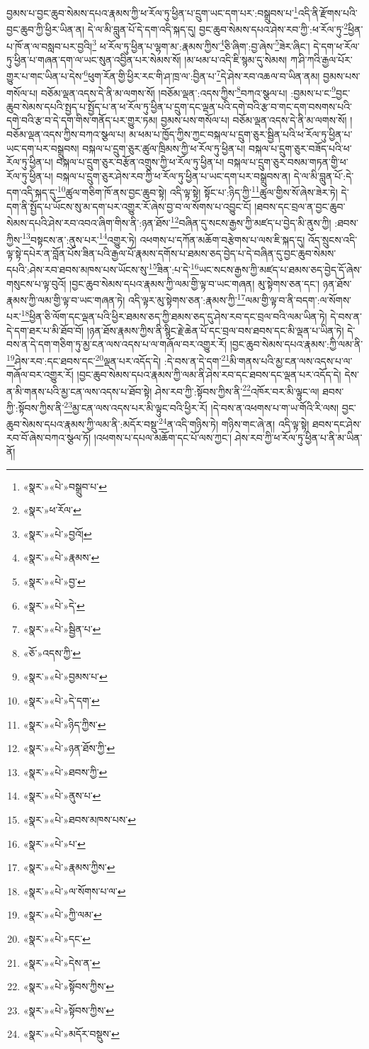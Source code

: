 བྱམས་པ་བྱང་ཆུབ་སེམས་དཔའ་རྣམས་ཀྱི་ཕ་རོལ་ཏུ་ཕྱིན་པ་དྲུག་ཡང་དག་པར་:བསྒྲུབས་པ་\footnote{«སྣར་»«པེ་»བསྒྲུབ་པ་}འདི་ནི་རྫོགས་པའི་བྱང་ཆུབ་ཀྱི་ཕྱིར་ཡིན་ན། དེ་ལ་མི་བླུན་པོ་དེ་དག་འདི་སྐད་དུ། བྱང་ཆུབ་སེམས་དཔའ་ཤེས་རབ་ཀྱི་:ཕ་རོལ་ཏུ་\footnote{«སྣར་»ཕ་རོལ་}ཕྱིན་པ་ཁོ་ན་ལ་བསླབ་པར་བྱའི།\footnote{«སྣར་»«པེ་»བྱའོ།} ཕ་རོལ་ཏུ་ཕྱིན་པ་ལྷག་མ་:རྣམས་ཀྱིས་\footnote{«སྣར་»«པེ་»རྣམས་}ཅི་ཞིག་:བྱ་ཞེས་\footnote{«སྣར་»«པེ་»བྱ་}ཟེར་ཞིང་། དེ་དག་ཕ་རོལ་ཏུ་ཕྱིན་པ་གཞན་དག་ལ་ཡང་སུན་འབྱིན་པར་སེམས་སོ། །མ་ཕམ་པ་འདི་ཇི་སྙམ་དུ་སེམས། ཀ་ཤི་ཀའི་རྒྱལ་པོར་གྱུར་པ་གང་ཡིན་པ་དེས་\footnote{«སྣར་»«པེ་»དེ་}ཕུག་རོན་གྱི་ཕྱིར་རང་གི་ཤ་ཁྲ་ལ་:བྱིན་པ་\footnote{«སྣར་»«པེ་»སྦྱིན་པ་}དེ་ཤེས་རབ་འཆལ་བ་ཡིན་ནམ། བྱམས་པས་གསོལ་པ། བཅོམ་ལྡན་འདས་དེ་ནི་མ་ལགས་སོ། །བཅོམ་ལྡན་:འདས་ཀྱིས་\footnote{«ཅོ་»འདས་ཀྱི་}བཀའ་སྩལ་པ། :བྱམས་པ་ང་\footnote{«སྣར་»«པེ་»བྱམས་པ་}བྱང་ཆུབ་སེམས་དཔའི་སྤྱད་པ་སྤྱོད་པ་ན་ཕ་རོལ་ཏུ་ཕྱིན་པ་དྲུག་དང་ལྡན་པའི་དགེ་བའི་རྩ་བ་གང་དག་བསགས་པའི་དགེ་བའི་རྩ་བ་དེ་དག་གིས་གནོད་པར་གྱུར་ཏམ། བྱམས་པས་གསོལ་པ། བཅོམ་ལྡན་འདས་དེ་ནི་མ་ལགས་སོ། །བཅོམ་ལྡན་འདས་ཀྱིས་བཀའ་སྩལ་པ། མ་ཕམ་པ་ཁྱོད་ཀྱིས་ཀྱང་བསྐལ་པ་དྲུག་ཅུར་སྦྱིན་པའི་ཕ་རོལ་ཏུ་ཕྱིན་པ་ཡང་དག་པར་བསྒྲུབས། བསྐལ་པ་དྲུག་ཅུར་ཚུལ་ཁྲིམས་ཀྱི་ཕ་རོལ་ཏུ་ཕྱིན་པ། བསྐལ་པ་དྲུག་ཅུར་བཟོད་པའི་ཕ་རོལ་ཏུ་ཕྱིན་པ། བསྐལ་པ་དྲུག་ཅུར་བརྩོན་འགྲུས་ཀྱི་ཕ་རོལ་ཏུ་ཕྱིན་པ། བསྐལ་པ་དྲུག་ཅུར་བསམ་གཏན་གྱི་ཕ་རོལ་ཏུ་ཕྱིན་པ། བསྐལ་པ་དྲུག་ཅུར་ཤེས་རབ་ཀྱི་ཕ་རོལ་ཏུ་ཕྱིན་པ་ཡང་དག་པར་བསྒྲུབས་ན། དེ་ལ་མི་བླུན་པོ་:དེ་དག་འདི་སྐད་དུ་\footnote{«སྣར་»«པེ་»དེ་དག་}ཚུལ་གཅིག་ཁོ་ནས་བྱང་ཆུབ་སྟེ། འདི་ལྟ་སྟེ། སྟོང་པ་:ཉིད་ཀྱི་\footnote{«སྣར་»«པེ་»ཉིད་ཀྱིས་}ཚུལ་གྱིས་སོ་ཞེས་ཟེར་ཏེ། དེ་དག་ནི་སྤྱོད་པ་ཡོངས་སུ་མ་དག་པར་འགྱུར་རོ་ཞེས་བྱ་བ་ལ་སོགས་པ་འབྱུང་ངོ། །ཐབས་དང་བྲལ་ན་བྱང་ཆུབ་སེམས་དཔའི་ཤེས་རབ་འབའ་ཞིག་གིས་ནི་:ཉན་ཐོས་\footnote{«སྣར་»«པེ་»ཉན་ཐོས་ཀྱི་}བཞིན་དུ་སངས་རྒྱས་ཀྱི་མཛད་པ་བྱེད་མི་ནུས་ཀྱི། :ཐབས་ཀྱིས་\footnote{«སྣར་»«པེ་»ཐབས་ཀྱི་}བསྟངས་ན་:ནུས་པར་\footnote{«སྣར་»«པེ་»ནུས་པ་}འགྱུར་ཏེ། འཕགས་པ་དཀོན་མཆོག་བརྩེགས་པ་ལས་ཇི་སྐད་དུ། འོད་སྲུངས་འདི་ལྟ་སྟེ་དཔེར་ན་བློན་པོས་ཟིན་པའི་རྒྱལ་པོ་རྣམས་དགོས་པ་ཐམས་ཅད་བྱེད་པ་དེ་བཞིན་དུ་བྱང་ཆུབ་སེམས་དཔའི་:ཤེས་རབ་ཐབས་མཁས་པས་ཡོངས་སུ་\footnote{«སྣར་»«པེ་»ཐབས་མཁས་པས་}ཟིན་:པ་དེ་\footnote{«སྣར་»«པེ་»པ་}ཡང་སངས་རྒྱས་ཀྱི་མཛད་པ་ཐམས་ཅད་བྱེད་དོ་ཞེས་གསུངས་པ་ལྟ་བུའོ། །བྱང་ཆུབ་སེམས་དཔའ་རྣམས་ཀྱི་ལམ་གྱི་ལྟ་བ་ཡང་གཞན། མུ་སྟེགས་ཅན་དང་། ཉན་ཐོས་རྣམས་ཀྱི་ལམ་གྱི་ལྟ་བ་ཡང་གཞན་ཏེ། འདི་ལྟར་མུ་སྟེགས་ཅན་:རྣམས་ཀྱི་\footnote{«སྣར་»«པེ་»རྣམས་ཀྱིས་}ལམ་གྱི་ལྟ་བ་ནི་བདག་:ལ་སོགས་པར་\footnote{«སྣར་»«པེ་»ལ་སོགས་པ་ལ་}ཕྱིན་ཅི་ལོག་དང་ལྡན་པའི་ཕྱིར་ཐམས་ཅད་ཀྱི་ཐམས་ཅད་དུ་ཤེས་རབ་དང་བྲལ་བའི་ལམ་ཡིན་ཏེ། དེ་བས་ན་དེ་དག་ཐར་པ་མི་ཐོབ་བོ། །ཉན་ཐོས་རྣམས་ཀྱིས་ནི་སྙིང་རྗེ་ཆེན་པོ་དང་བྲལ་བས་ཐབས་དང་མི་ལྡན་པ་ཡིན་ཏེ། དེ་བས་ན་དེ་དག་གཅིག་ཏུ་མྱ་ངན་ལས་འདས་པ་ལ་གཞོལ་བར་འགྱུར་རོ། །བྱང་ཆུབ་སེམས་དཔའ་རྣམས་:ཀྱི་ལམ་ནི་\footnote{«སྣར་»«པེ་»ཀྱི་ལམ་}ཤེས་རབ་:དང་ཐབས་དང་\footnote{«སྣར་»«པེ་»དང་}ལྡན་པར་འདོད་དེ། :དེ་བས་ན་དེ་དག་\footnote{«སྣར་»«པེ་»དེས་ན་}མི་གནས་པའི་མྱ་ངན་ལས་འདས་པ་ལ་གཞོལ་བར་འགྱུར་རོ། །བྱང་ཆུབ་སེམས་དཔའ་རྣམས་ཀྱི་ལམ་ནི་ཤེས་རབ་དང་ཐབས་དང་ལྡན་པར་འདོད་དེ། དེས་ན་མི་གནས་པའི་མྱ་ངན་ལས་འདས་པ་ཐོབ་སྟེ། ཤེས་རབ་ཀྱི་:སྟོབས་ཀྱིས་ནི་\footnote{«སྣར་»«པེ་»སྟོབས་ཀྱིས་}འཁོར་བར་མི་ལྟུང་ལ། ཐབས་ཀྱི་:སྟོབས་ཀྱིས་ནི་\footnote{«སྣར་»«པེ་»སྟོབས་ཀྱིས་}མྱ་ངན་ལས་འདས་པར་མི་ལྟུང་བའི་ཕྱིར་རོ། །དེ་བས་ན་འཕགས་པ་ག་ཡ་གོའི་རི་ལས། བྱང་ཆུབ་སེམས་དཔའ་རྣམས་ཀྱི་ལམ་ནི་:མདོར་བསྡུ་\footnote{«སྣར་»«པེ་»མདོར་བསྡུས་}ན་འདི་གཉིས་ཏེ། གཉིས་གང་ཞེ་ན། འདི་ལྟ་སྟེ། ཐབས་དང་ཤེས་རབ་བོ་ཞེས་བཀའ་སྩལ་ཏོ། །འཕགས་པ་དཔལ་མཆོག་དང་པོ་ལས་ཀྱང་། ཤེས་རབ་ཀྱི་ཕ་རོལ་ཏུ་ཕྱིན་པ་ནི་མ་ཡིན་ནོ། 